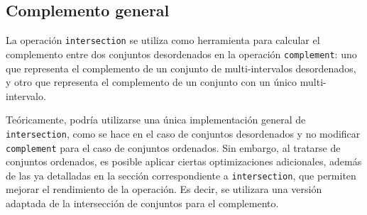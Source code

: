 \begin{center}
\end{center}



\subsection{Complemento general}

La operación \texttt{intersection} se utiliza como herramienta para calcular el complemento entre dos conjuntos desordenados en la operación \texttt{complement}: uno que representa el complemento de un conjunto de multi-intervalos desordenados, y otro que representa el complemento de un conjunto con un único multi-intervalo.

Teóricamente, podría utilizarse una única implementación general de \texttt{intersection}, como se hace en el caso de conjuntos desordenados y no modificar \texttt{complement} para el caso de conjuntos ordenados. Sin embargo, al tratarse de conjuntos ordenados, es posible aplicar ciertas optimizaciones adicionales, además de las ya detalladas en la sección correspondiente a \texttt{intersection}, que permiten mejorar el rendimiento de la operación. Es decir, se utilizara una versión adaptada de la intersección de conjuntos para el complemento.


